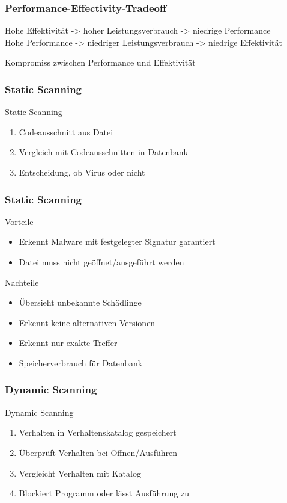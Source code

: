 \documentclass{beamer}
\begin{document}
\begin{frame}
\frametitle{Performance-Effectivity-Tradeoff}
Hohe Effektivität -> hoher Leistungsverbrauch -> niedrige Performance\\
Hohe Performance -> niedriger Leistungsverbrauch -> niedrige Effektivität

\begin{block}{}
	Kompromiss zwischen Performance und Effektivität
\end{block}
\end{frame}


\begin{frame}
\frametitle{Static Scanning}
\begin{block}{Static Scanning}
	\begin{enumerate}
		\item Codeausschnitt aus Datei
		\item Vergleich mit Codeausschnitten in Datenbank
		\item Entscheidung, ob Virus oder nicht
	\end{enumerate}
\end{block} 
\end{frame}

\begin{frame}
	\frametitle{Static Scanning}
	\begin{block}{Vorteile}
		\begin{itemize}
			\item Erkennt Malware mit festgelegter Signatur garantiert
			\item Datei muss nicht geöffnet/ausgeführt werden
		\end{itemize}
	\end{block} 
	\begin{block}{Nachteile}
		\begin{itemize}
			\item Übersieht unbekannte Schädlinge
			\item Erkennt keine alternativen Versionen
			\item Erkennt nur exakte Treffer
			\item Speicherverbrauch für Datenbank
		\end{itemize}
	\end{block}
\end{frame}

\begin{frame}
\frametitle{Dynamic Scanning}
\begin{block}{Dynamic Scanning}
	\begin{enumerate}
		\item Verhalten in Verhaltenskatalog gespeichert
		\item Überprüft Verhalten bei Öffnen/Ausführen
		\item Vergleicht Verhalten mit Katalog
		\item Blockiert Programm oder lässt Ausführung zu
	\end{enumerate}
	
\end{block} 
\end{frame}
\end{document}
